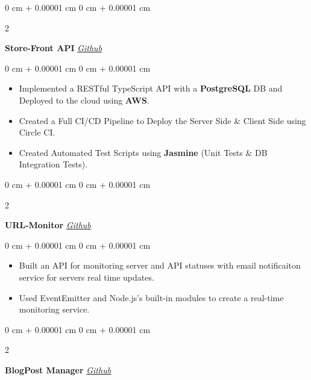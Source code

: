 \documentclass[10pt, letterpaper]{article}
\newenvironment{highlights}{
    \begin{itemize}[
        topsep=0.10 cm,
        parsep=0.10 cm,
        partopsep=0pt,
        itemsep=1pt,
        leftmargin=0 cm + 12pt
    ]
}{
    \end{itemize}
} %
\newenvironment{onecolentry}{
    \begin{adjustwidth}{
        0 cm + 0.00001 cm
    }{
        0 cm + 0.00001 cm
    }
}{
    \end{adjustwidth}
} %
\newenvironment{twocolentry}[2][]{
    \onecolentry
    \def\secondColumn{#2}
    \setcolumnwidth{\fill, 4.5 cm}
    \begin{paracol}{2}
}{
    \switchcolumn \raggedleft \secondColumn
    \end{paracol}
    \endonecolentry
} %
\begin{document}
        \begin{twocolentry}{
            \href{https://github.com/Ahmad-Abdalmageed/Store-API}{\textit{Github}}
        }
            \textbf{Store-Front API}\end{twocolentry}

        \vspace{0.10 cm}
        \begin{onecolentry}
            \begin{highlights}
                \item Implemented a RESTful TypeScript API with a \textbf{PostgreSQL} DB and Deployed to the cloud using \textbf{AWS}.
                \item Created a Full CI/CD Pipeline to Deploy the Server Side \& Client Side using Circle CI.
                \item Created Automated Test Scripts using \textbf{Jasmine} (Unit Tests \& DB Integration Tests).
            \end{highlights}
        \end{onecolentry}


        \vspace{0.1 cm}

        \begin{twocolentry}{
            \href{https://github.com/Ahmad-Abdalmageed/URL-Monitor}{\textit{Github}}
        }
            \textbf{URL-Monitor}\end{twocolentry}

        \vspace{0.10 cm}
        \begin{onecolentry}
            \begin{highlights}
                \item Built an API for monitoring server and API statuses with email notificaiton service for servers real time updates.
                \item Used EventEmitter and Node.js's built-in modules to create a real-time monitoring service.
            \end{highlights}
        \end{onecolentry}


        \vspace{0.1 cm}

        \begin{twocolentry}{
            \href{https://github.com/Ahmad-Abdalmageed/blog}{\textit{Github}}
        }
            \textbf{BlogPost Manager}\end{twocolentry}
\end{document}
